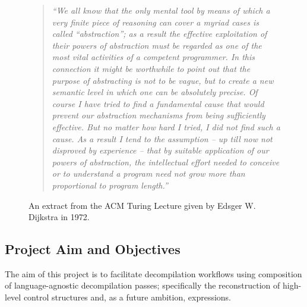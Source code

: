 \documentclass[12pt, a4paper]{article}
\begin{document}
\begin{figure}[htbp]
	\begin{quote}
		\textit{``We all know that the only mental tool by means of which a very finite piece of reasoning can cover a myriad cases is called ``abstraction''; as a result the effective exploitation of their powers of abstraction must be regarded as one of the most vital activities of a competent programmer. In this connection it might be worthwhile to point out that the purpose of abstracting is not to be vague, but to create a new semantic level in which one can be absolutely precise. Of course I have tried to find a fundamental cause that would prevent our abstraction mechanisms from being sufficiently effective. But no matter how hard I tried, I did not find such a cause. As a result I tend to the assumption -- up till now not disproved by experience -- that by suitable application of our powers of abstraction, the intellectual effort needed to conceive or to understand a program need not grow more than proportional to program length.''} \cite{abstractions_quote}
	\end{quote}
	\caption{An extract from the ACM Turing Lecture given by Edsger W. Dijkstra in 1972.}
	\label{dijkstra_lecture}
\end{figure}



\subsection{Project Aim and Objectives}

The aim of this project is to facilitate decompilation workflows using composition of language-agnostic decompilation passes; specifically the reconstruction of high-level control structures and, as a future ambition, expressions.
\end{document}
